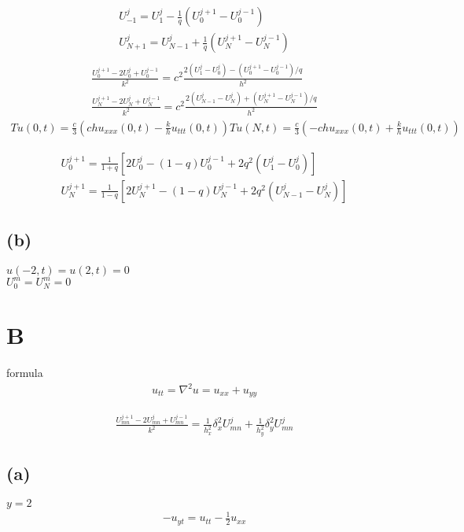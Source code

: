\documentclass[en,hazy,screen,blue,normal]{elegantnote}
\begin{document}
\begin{align*}
    U_{-1}^{j} = U_1^j - \frac{1}{q} (U_0^{j+1}-U_0^{j-1}) \\
    U_{N+1}^{j} = U_{N-1}^j + \frac{1}{q} (U_N^{j+1}-U_N^{j-1}) \\
\end{align*}
\begin{align*}
    \frac{U_0^{j+1}-2U_0^j+U_0^{j-1}}{k^2} = c^2 \frac{2(U_1^j -U_0^j) -(U_0^{j+1} -U_0^{j-1})/q}{h^2} \\
    \frac{U_{N}^{j+1}-2U_N^j+U_N^{j-1}}{k^2} = c^2 \frac{2(U_{N-1}^j - U_N^j) + (U_N^{j+1} - U_N^{j-1})/q}{h^2}
\end{align*}
\begin{align*}
    Tu(0, t) = \frac{c}{3} (ch u_{xxx}(0, t) - \frac{k}{h}u_{ttt}(0, t))
    Tu(N, t) = \frac{c}{3} (-ch u_{xxx}(0, t) + \frac{k}{h}u_{ttt}(0, t))
\end{align*}

\begin{align*}
    U_0^{j+1} = \frac{1}{1+q} [2U_0^j -(1-q)U_0^{j-1} + 2q^2(U_1^j - U_0^j)] \\
    U_N^{j+1} = \frac{1}{1-q} [2U_N^{j+1} -(1-q)U_{N}^{j-1} + 2q^2 (U_{N-1}^j - U_{N}^j)]
\end{align*}



\subsection{(b)}
$u(-2, t) = u(2, t) = 0$ \\
$U_0^m = U_N^m = 0$



\section{B}
formula
\begin{align*}
    u_{tt} = \nabla^2 u = u_{xx} + u_{yy}
\end{align*}

\begin{align*}
    \frac{U_{mn}^{j+1}-2U_{mn}^{j}+U_{mn}^{j-1}}{k^2}
    = \frac{1}{h_x^2} \delta_{x}^2 U_{mn}^{j} + \frac{1}{h_y^2} \delta_{y}^2 U_{mn}^{j}
\end{align*}

\subsection{(a)}
$y=2$
\begin{align*}
    -u_{yt} = u_{tt} - \frac{1}{2} u_{xx}
\end{align*}
\end{document}
